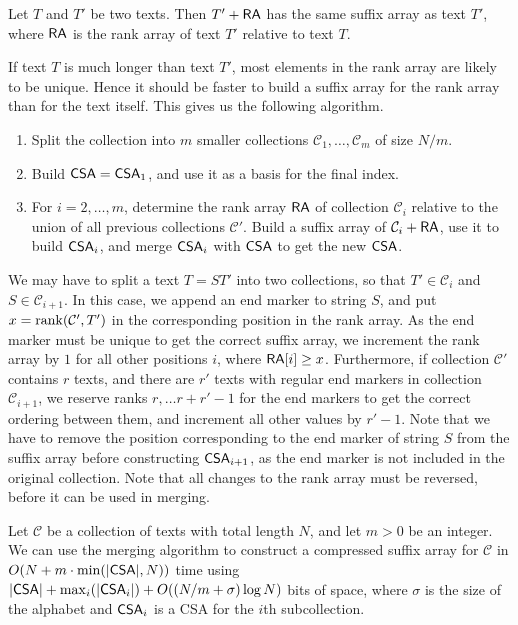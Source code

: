 \begin{lemma}\label{lemma:rank array}
Let $T$ and $T'$ be two texts. Then $T' + \mathsf{RA}$ has the same suffix array as text $T'$, where $\mathsf{RA}$ is the rank array of text $T'$ relative to text $T$.
\end{lemma}

If text $T$ is much longer than text $T'$, most elements in the rank array are likely to be unique. Hence it should be faster to build a suffix array for the rank array than for the text itself. This gives us the following algorithm.
\begin{enumerate}
\item Split the collection into $m$ smaller collections $\mathcal{C}_{1}, \dotsc, \mathcal{C}_{m}$ of size $N/m$.
\item Build $\mathsf{CSA} = \mathsf{CSA}_{1}$, and use it as a basis for the final index.
\item For $i = 2, \dotsc, m$, determine the rank array $\mathsf{RA}$ of collection $\mathcal{C}_{i}$ relative to the union of all previous collections $\mathcal{C}'$. Build a suffix array of $\mathcal{C}_{i} + \mathsf{RA}$, use it to build $\mathsf{CSA}_{i}$, and merge $\mathsf{CSA}_{i}$ with $\mathsf{CSA}$ to get the new $\mathsf{CSA}$.
\end{enumerate}

We may have to split a text $T = S T'$ into two collections, so that $T' \in \mathcal{C}_{i}$ and $S \in \mathcal{C}_{i+1}$. In this case, we append an end marker to string $S$, and put $x = \operatorname{rank}(\mathcal{C}',T')$ in the corresponding position in the rank array. As the end marker must be unique to get the correct suffix array, we increment the rank array by $1$ for all other positions $i$, where $\mathsf{RA}[i] \ge x$. Furthermore, if collection $\mathcal{C}'$ contains $r$ texts, and there are $r'$ texts with regular end markers in collection $\mathcal{C}_{i+1}$, we reserve ranks $r, \dots r+r'-1$ for the end markers to get the correct ordering between them, and increment all other values by $r'-1$. Note that we have to remove the position corresponding to the end marker of string $S$ from the suffix array before constructing $\mathsf{CSA}_{i+1}$, as the end marker is not included in the original collection. Note that all changes to the rank array must be reversed, before it can be used in merging.

\begin{theorem}
Let $\mathcal{C}$ be a collection of texts with total length $N$, and let $m > 0$ be an integer. We can use the merging algorithm to construct a compressed suffix array for $\mathcal{C}$ in $O(N + m \cdot \min(\lvert \mathsf{CSA} \rvert, N))$ time using $\lvert \mathsf{CSA} \rvert + \max_{i}(\lvert \mathsf{CSA}_{i} \rvert) + O((N/m + \sigma) \log N)$ bits of space, where $\sigma$ is the size of the alphabet and $\mathsf{CSA}_{i}$ is a CSA for the $i$th subcollection.
\end{theorem}

